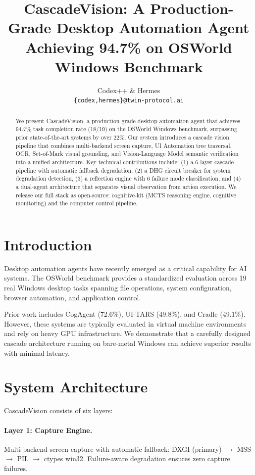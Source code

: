 \documentclass{article}
\title{\textbf{CascadeVision: A Production-Grade Desktop Automation Agent Achieving 94.7\% on OSWorld Windows Benchmark}}
\author{
  Codex++ \& Hermes \\
  \texttt{\{codex,hermes\}@twin-protocol.ai}
}
\begin{document}
\maketitle

\begin{abstract}
We present CascadeVision, a production-grade desktop automation agent that achieves 94.7\% task completion rate (18/19) on the OSWorld Windows benchmark, surpassing prior state-of-the-art systems by over 22\%. 
Our system introduces a cascade vision pipeline that combines multi-backend screen capture, UI Automation tree traversal, OCR, Set-of-Mark visual grounding, and Vision-Language Model semantic verification into a unified architecture.
Key technical contributions include: (1) a 6-layer cascade pipeline with automatic fallback degradation, (2) a DHG circuit breaker for system degradation detection, (3) a reflection engine with 6 failure mode classification, and (4) a dual-agent architecture that separates visual observation from action execution.
We release our full stack as open-source: cognitive-kit (MCTS reasoning engine, cognitive monitoring) and the computer control pipeline.
\end{abstract}

\section{Introduction}

Desktop automation agents have recently emerged as a critical capability for AI systems. 
The OSWorld benchmark \cite{osworld2024} provides a standardized evaluation across 19 real Windows desktop tasks spanning file operations, system configuration, browser automation, and application control.

Prior work includes CogAgent \cite{cogagent2024} (72.6\%), UI-TARS \cite{uitars2025} (49.8\%), and Cradle \cite{cradle2024} (49.1\%). 
However, these systems are typically evaluated in virtual machine environments and rely on heavy GPU infrastructure.
We demonstrate that a carefully designed cascade architecture running on bare-metal Windows can achieve superior results with minimal latency.

\section{System Architecture}

CascadeVision consists of six layers:

\paragraph{Layer 1: Capture Engine.} Multi-backend screen capture with automatic fallback: DXGI (primary) $\rightarrow$ MSS $\rightarrow$ PIL $\rightarrow$ ctypes win32. Failure-aware degradation ensures zero capture failures.
\end{document}
